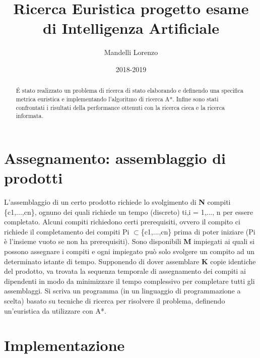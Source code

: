 \documentclass[]{article}
\title{Ricerca Euristica progetto esame di Intelligenza Artificiale}
\date{2018-2019}
\author{Mandelli Lorenzo}
\begin{document}
\maketitle

\begin{abstract}
	\noindent \'E stato realizzato un problema di ricerca di stato elaborando e definendo una specifica metrica euristica e implementando l'algoritmo di ricerca A*. Infine sono stati confrontati i risultati della performance ottenuti con la ricerca cieca e la ricerca informata.
\end{abstract}

\section{Assegnamento: assemblaggio di prodotti}
	L’assemblaggio di un certo prodotto richiede lo svolgimento di \textbf{N} compiti \{c1,...,cn\}, ognuno dei quali richiede un tempo (discreto) ti,i = 1,..., n per essere completato. 
	Alcuni compiti richiedono certi prerequisiti, ovvero il compito ci richiede il completamento dei compiti Pi $\subset$\{c1,...,cn\}  prima di  poter iniziare (Pi è l’insieme vuoto se non ha prerequisiti).
	Sono disponibili \textbf{M} impiegati ai quali si possono assegnare i compiti e ogni impiegato può solo svolgere un compito ad un determinato istante di tempo. 
	Supponendo di dover assemblare \textbf{K} copie identiche del prodotto, va trovata la sequenza temporale di assegnamento dei
	compiti ai dipendenti in modo da minimizzare il tempo complessivo per completare tutti gli assemblaggi.
	Si scriva un programma (in un linguaggio di programmazione a scelta) basato su tecniche di ricerca per risolvere il problema, definendo un’euristica da utilizzare con A*.

\section{Implementazione}
\end{document}
